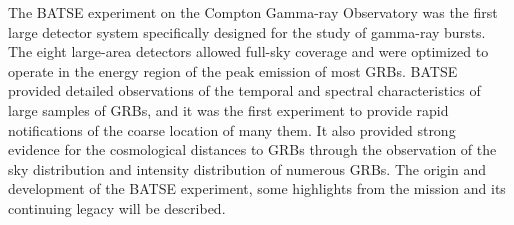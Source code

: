 


\bigskip



\bigskip

\noindent The BATSE experiment on the Compton Gamma-ray Observatory was the first large detector system specifically designed for the study of gamma-ray bursts. The eight large-area detectors allowed full-sky coverage and were optimized to operate in the energy region of the peak emission of most GRBs.  BATSE provided detailed observations of the temporal and spectral characteristics of large samples of GRBs, and it was the first experiment to provide rapid notifications of the coarse location of many them.  It also provided strong evidence for the cosmological distances to GRBs through the observation of the sky distribution and intensity distribution of numerous GRBs.  The origin and development of the BATSE experiment, some highlights from the mission and its continuing legacy will be described.
